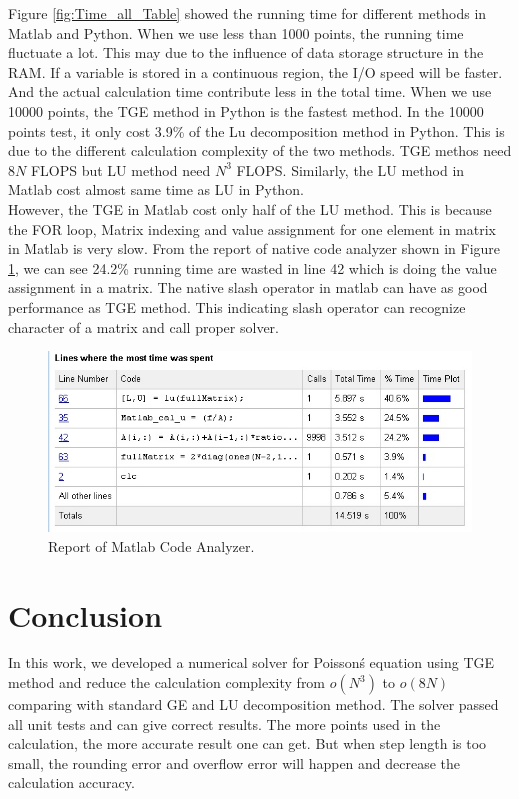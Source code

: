 \documentclass{article}
\begin{document}
Figure \ref{fig:Time_all_Table} showed the running time for different methods in Matlab and Python. When we use less than 1000 points, the running time fluctuate a lot. This may due to the influence of data storage structure in the RAM. If a variable is stored in a continuous region, the I/O speed will be faster. And the actual calculation time contribute less in the total time. When we use 10000 points, the TGE method in Python is the fastest method. In the 10000 points test, it only cost 3.9\% of the Lu decomposition method in Python. This is due to the different calculation complexity of the two methods. TGE methos need $8N$ FLOPS but LU method need $N^3$ FLOPS. Similarly, the LU method in Matlab cost almost same time as LU in Python.\\
However, the TGE in Matlab cost only half of the LU method. This is because the FOR loop, Matrix indexing and value assignment for one element in matrix in Matlab is very slow. From the report of native code analyzer shown in Figure \ref{fig:RunTimeAnalysis}, we can see 24.2\% running time are wasted in line 42 which is doing the value assignment in a matrix.
The native slash operator in matlab can have as good performance as TGE method. This indicating slash operator can recognize character of a matrix and call proper solver. 
\begin{figure}
\centering
\includegraphics[width=1\linewidth]{../figures/RunTimeAnalysis}
\caption{Report of Matlab Code Analyzer.}
\label{fig:RunTimeAnalysis}
\end{figure}

\section{Conclusion}
In this work, we developed a numerical solver for Poisson\'s equation using TGE method and reduce the calculation complexity from $o(N^3)$ to $o(8N)$ comparing with standard GE and LU decomposition method. The solver passed all unit tests and can give correct results. The more points used in the calculation, the more accurate result one can get. But when step length is too small, the rounding error and overflow error will happen and decrease the calculation accuracy. 



\end{document}
